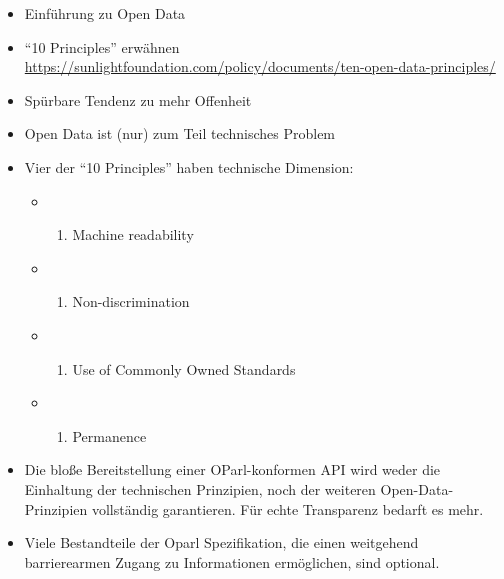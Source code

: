 \documentclass[,a4paper]{article}
\begin{document}
\begin{itemize}
\itemsep1pt\parskip0pt
\item
  Einführung zu Open Data
\item
  ``10 Principles'' erwähnen
  \url{https://sunlightfoundation.com/policy/documents/ten-open-data-principles/}
\item
  Spürbare Tendenz zu mehr Offenheit
\item
  Open Data ist (nur) zum Teil technisches Problem
\item
  Vier der ``10 Principles'' haben technische Dimension:

  \begin{itemize}
  \item
    \begin{enumerate}
    \def\labelenumi{\arabic{enumi}.}
    \setcounter{enumi}{4}
    \itemsep1pt\parskip0pt
    \item
      Machine readability
    \end{enumerate}
  \item
    \begin{enumerate}
    \def\labelenumi{\arabic{enumi}.}
    \setcounter{enumi}{5}
    \itemsep1pt\parskip0pt
    \item
      Non-discrimination
    \end{enumerate}
  \item
    \begin{enumerate}
    \def\labelenumi{\arabic{enumi}.}
    \setcounter{enumi}{6}
    \itemsep1pt\parskip0pt
    \item
      Use of Commonly Owned Standards
    \end{enumerate}
  \item
    \begin{enumerate}
    \def\labelenumi{\arabic{enumi}.}
    \setcounter{enumi}{8}
    \itemsep1pt\parskip0pt
    \item
      Permanence
    \end{enumerate}
  \end{itemize}
\item
  Die bloße Bereitstellung einer OParl-konformen API wird weder die
  Einhaltung der technischen Prinzipien, noch der weiteren
  Open-Data-Prinzipien vollständig garantieren. Für echte Transparenz
  bedarft es mehr.
\item
  Viele Bestandteile der Oparl Spezifikation, die einen weitgehend
  barrierearmen Zugang zu Informationen ermöglichen, sind optional.


\end{itemize}
\end{document}
